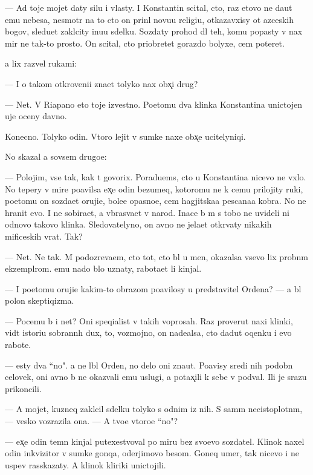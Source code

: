 \documentclass[10pt]{book}
\begin{document}
— Ad toje mojet daty silu i vlasty. I Konstantin scital, cto, raz etovo ne da{\y}ut {\y}emu nebesa, nesmotr{\ia} na to cto on prin{\ia}l novu{\y}u religi{\y}u, otkazavxisy ot {\y}az{\yi}ceskih bogov, sledu{\y}et zakl{\iu}city inu{\y}u sdelku. Sozdaty prohod dl{\ia} teh, komu popasty v nax mir ne tak-to prosto. On scital, cto priobretet gorazdo bolyxe, cem poter{\ia}{\y}et.

{\Y}a lix razvel rukami:

— I o takom otkroveni{\y}i zna{\y}et tolyko nax obx̨i{\y} drug?

— Net. V Riapano eto toje izvestno. Poetomu dva klinka Konstantina unictojen{\yi} uje oceny davno.

Konecno. Tolyko odin. Vtoro{\y} lejit v sumke naxe{\y} obx̨e{\y} ucitelyniqi.

No skazal {\y}a sovsem drugo{\y}e:

— Polojim, vse tak, kak t{\yi} govorix. Poradu{\y}ems{\ia}, cto u Konstantina nicevo ne v{\yi}xlo. No tepery v mire po{\y}avilsa {\y}ex̨e odin bezumeq, kotoromu ne k cemu prilojity ruki, poetomu on sozda{\y}et oruji{\y}e, bole{\y}e opasno{\y}e, cem hagjitska{\y}a pescana{\y}a kobra. No ne hranit {\y}evo. I ne sobira{\y}et, a v{\yi}bras{\yi}va{\y}et v narod. Inace b{\yi} m{\yi} s tobo{\y} ne uvideli ni odnovo takovo klinka. Sledovatelyno, on {\y}avno ne jela{\y}et otkr{\yi}vaty nikakih mificeskih vrat. Tak?

— Net. Ne tak. M{\yi} podozreva{\y}em, cto tot, cto b{\yi}l u men{\ia}, okazalsa vsevo lix probn{\yi}m ekzempl{\ia}rom. {\Y}emu nado b{\yi}lo uznaty, rabota{\y}et li kinjal.

— I poetomu oruji{\y}e kakim-to obrazom po{\y}avilosy u predstavitel{\ia} Ordena? — {\Y}a b{\yi}l polon skeptiqizma.

— Pocemu b{\yi} i net? Oni speqialist{\yi} v takih voprosah. Raz prover{\ia}{\y}ut naxi klinki, vid{\ia}t istori{\y}u sobrann{\yi}h dux, to, vozmojno, on nade{\y}alsa, cto dadut oqenku i {\y}evo rabote.

— {\Y}esty dva ``no". {\Y}a ne l{\iu}bl{\iu} Orden, no delo oni zna{\y}ut. Po{\y}avisy sredi nih podobn{\yi}{\y} celovek, oni {\y}avno b{\yi} ne okaz{\yi}vali {\y}emu uslugi, a potax̨ili k sebe v podval{\yi}. Ili je srazu prikoncili.

— A mojet, kuzneq zakl{\iu}cil sdelku tolyko s odnim iz nih. S sam{\yi}m necistoplotn{\yi}m, — vesko vozrazila ona. — A tvo{\y}e vtoro{\y}e ``no"?

— {\Y}ex̨e odin temn{\yi}{\y} kinjal putexestvoval po miru bez svo{\y}evo sozdatel{\ia}. Klinok naxel odin inkvizitor v sumke gonqa, oderjimovo besom. Goneq umer, tak nicevo i ne uspev rasskazaty. A klinok kliriki unictojili.
\end{document}
